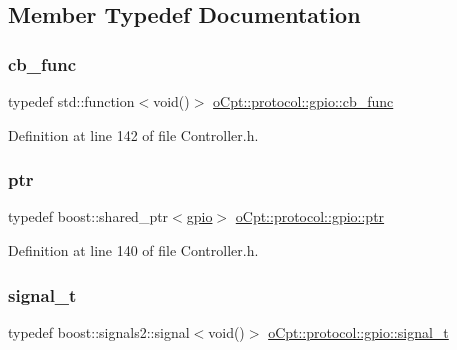 \subsection{Member Typedef Documentation}
\hypertarget{classo_cpt_1_1protocol_1_1gpio_ad553926a5fc9db445e7c9715abede2e3}{}\label{classo_cpt_1_1protocol_1_1gpio_ad553926a5fc9db445e7c9715abede2e3} 
\subsubsection{\texorpdfstring{cb\+\_\+func}{cb\_func}}
{\footnotesize\ttfamily typedef std\+::function$<$void()$>$ \hyperlink{classo_cpt_1_1protocol_1_1gpio_ad553926a5fc9db445e7c9715abede2e3}{o\+Cpt\+::protocol\+::gpio\+::cb\+\_\+func}}



Definition at line 142 of file Controller.\+h.

\hypertarget{classo_cpt_1_1protocol_1_1gpio_acd4fb0fba7a813a8013511b374e73900}{}\label{classo_cpt_1_1protocol_1_1gpio_acd4fb0fba7a813a8013511b374e73900} 
\subsubsection{\texorpdfstring{ptr}{ptr}}
{\footnotesize\ttfamily typedef boost\+::shared\+\_\+ptr$<$\hyperlink{classo_cpt_1_1protocol_1_1gpio}{gpio}$>$ \hyperlink{classo_cpt_1_1protocol_1_1gpio_acd4fb0fba7a813a8013511b374e73900}{o\+Cpt\+::protocol\+::gpio\+::ptr}}



Definition at line 140 of file Controller.\+h.

\hypertarget{classo_cpt_1_1protocol_1_1gpio_aa875802b20c7ef999c44af68e7f23621}{}\label{classo_cpt_1_1protocol_1_1gpio_aa875802b20c7ef999c44af68e7f23621} 
\subsubsection{\texorpdfstring{signal\+\_\+t}{signal\_t}}
{\footnotesize\ttfamily typedef boost\+::signals2\+::signal$<$void()$>$ \hyperlink{classo_cpt_1_1protocol_1_1gpio_aa875802b20c7ef999c44af68e7f23621}{o\+Cpt\+::protocol\+::gpio\+::signal\+\_\+t}}



